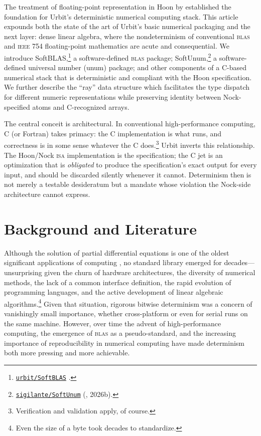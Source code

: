 \documentclass[twoside]{article}
\begin{document}
The treatment of floating-point representation in Hoon by \citet{Davis2024} established the foundation for Urbit's deterministic numerical computing stack.  This article expounds both the state of the art of Urbit's basic numerical packaging and the next layer:  dense linear algebra, where the nondeterminism of conventional \textsc{blas} and \textsc{ieee} 754 floating-point mathematics are acute and consequential.  We introduce SoftBLAS,\footnote{\href{https://github.com/urbit/SoftBLAS}{\texttt{urbit/SoftBLAS}} \citep{urbit_softblas}.} a software-defined \textsc{blas} package; SoftUnum,\footnote{\href{https://github.com/sigilante/SoftUnum}{\texttt{sigilante/SoftUnum}} (, 2026b).\nocite{urbit_softunum}} a software-defined universal number (unum) package; and other components of a C-based numerical stack that is deterministic and compliant with the Hoon specification.  We further describe the ``ray'' data structure which facilitates the type dispatch for different numeric representations while preserving identity between Nock-specified atoms and C-recognized arrays.

The central conceit is architectural.  In conventional high-performance computing, C (or Fortran) takes primacy:  the C implementation is what runs, and correctness is in some sense whatever the C does.\footnote{Verification and validation apply, of course.}  Urbit inverts this relationship.  The Hoon/Nock \textsc{isa} implementation is the specification; the C jet is an optimization that is \emph{obligated} to produce the specification's exact output for every input, and should be discarded silently whenever it cannot.  Determinism then is not merely a testable desideratum but a mandate whose violation the Nock-side architecture cannot express.

\section{Background and Literature}

Although the solution of partial differential equations is one of the oldest significant applications of computing \citep{Charney1950}, no standard library emerged for decades---unsurprising given the churn of hardware architectures, the diversity of numerical methods, the lack of a common interface definition, the rapid evolution of programming languages, and the active development of linear algebraic algorithms.\footnote{Even the size of a byte took decades to standardize.}  Given that situation, rigorous bitwise determinism was a concern of vanishingly small importance, whether cross-platform or even for serial runs on the same machine.  However, over time the advent of high-performance computing, the emergence of \textsc{blas} as a pseudo-standard, and the increasing importance of reproducibility in numerical computing have made determinism both more pressing and more achievable.
\end{document}
